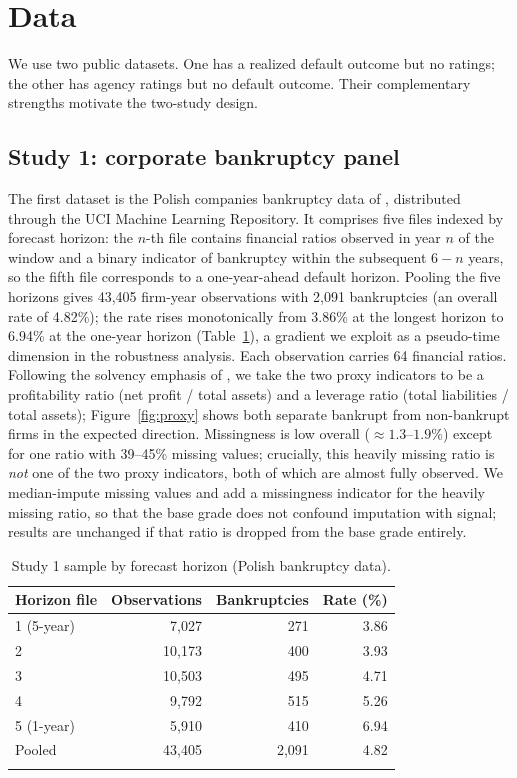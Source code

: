\documentclass[pdflatex,sn-mathphys-ay]{sn-jnl}
\begin{document}
\section{Data}\label{sec:data}

We use two public datasets. One has a realized default outcome but no ratings; the other has agency
ratings but no default outcome. Their complementary strengths motivate the two-study design.

\subsection{Study 1: corporate bankruptcy panel}
The first dataset is the Polish companies bankruptcy data of \citet{zieba2016}, distributed through
the UCI Machine Learning Repository. It comprises five files indexed by forecast horizon: the
$n$-th file contains financial ratios observed in year $n$ of the window and a binary indicator of
bankruptcy within the subsequent $6-n$ years, so the fifth file corresponds to a one-year-ahead
default horizon. Pooling the five horizons gives 43{,}405 firm-year observations with 2{,}091
bankruptcies (an overall rate of 4.82\%); the rate rises monotonically from 3.86\% at the longest
horizon to 6.94\% at the one-year horizon (Table~\ref{tab:polish}), a gradient we exploit as a
pseudo-time dimension in the robustness analysis. Each observation carries 64 financial ratios.
Following the solvency emphasis of \citet{altman1968}, we take the two proxy indicators to be a
profitability ratio (net profit / total assets) and a leverage ratio (total liabilities / total
assets); Figure~\ref{fig:proxy} shows both separate bankrupt from non-bankrupt firms in the expected
direction. Missingness is low overall ($\approx 1.3$--$1.9\%$) except for one ratio with 39--45\%
missing values; crucially, this heavily missing ratio is \emph{not} one of the two proxy indicators,
both of which are almost fully observed. We median-impute missing values and add a missingness
indicator for the heavily missing ratio, so that the base grade does not confound imputation with
signal; results are unchanged if that ratio is dropped from the base grade entirely.

\begin{table}[t]
\centering
\caption{Study 1 sample by forecast horizon (Polish bankruptcy data).}
\label{tab:polish}
\begin{tabular}{@{}lrrr@{}}
\toprule
Horizon file & Observations & Bankruptcies & Rate (\%) \\
\midrule
1 (5-year)   & 7{,}027  & 271 & 3.86 \\
2            & 10{,}173 & 400 & 3.93 \\
3            & 10{,}503 & 495 & 4.71 \\
4            & 9{,}792  & 515 & 5.26 \\
5 (1-year)   & 5{,}910  & 410 & 6.94 \\
\midrule
Pooled       & 43{,}405 & 2{,}091 & 4.82 \\
\botrule
\end{tabular}
\end{table}
\end{document}
